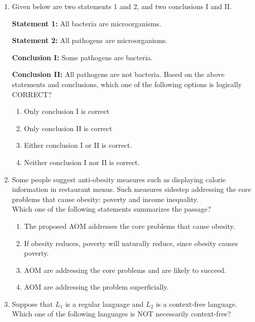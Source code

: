 \documentclass[a4paper, 11pt]{article}
\begin{document}
\begin{enumerate}
    \item Given below are two statements 1 and 2, and two conclusions I and II.
    
    \textbf{Statement 1:} All bacteria are microorganisms.
    
    \textbf{Statement 2:} All pathogens are microorganisms.
    
    \textbf{Conclusion I:} Some pathogens are bacteria.
    
    \textbf{Conclusion II:} All pathogens are not bacteria.
    Based on the above statements and conclusions, which one of the following options is logically CORRECT?
    \begin{enumerate}
        \item Only conclusion I is correct
        \item Only conclusion II is correct
        \item Either conclusion I or II is correct.
        \item Neither conclusion I nor II is correct.
    \end{enumerate}
    \hfill{}

    \item Some people suggest anti-obesity measures  such as displaying calorie information in restaurant menus. Such measures sidestep addressing the core problems that cause obesity: poverty and income inequality.\\Which one of the following statements summarizes the passage?
    \begin{enumerate}
        \item The proposed AOM addresses the core problems that cause obesity.
        \item If obesity reduces, poverty will naturally reduce, since obesity causes poverty.
        \item AOM are addressing the core problems and are likely to succeed.
        \item AOM are addressing the problem superficially.
    \end{enumerate}
    \hfill{}
    
    \item Suppose that $L_1$ is a regular language and $L_2$ is a context-free language. Which one of the following languages is NOT necessarily context-free?
    \begin{enumerate}
    \end{enumerate}
    \hfill{}
    

\end{enumerate}
\end{document}
